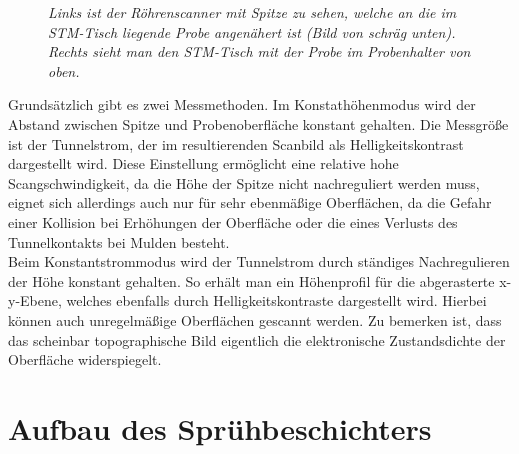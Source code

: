 \begin{figure}[H]
\centering
\sffamily

\caption{\textit{Links ist der Röhrenscanner mit Spitze zu sehen, welche an die im STM-Tisch
liegende Probe angenähert ist (Bild von schräg unten). Rechts sieht man den STM-Tisch mit der
Probe im Probenhalter von oben.}}
\label{stmaufbau}
\end{figure}

Grundsätzlich gibt es zwei Messmethoden. Im Konstathöhenmodus wird der Abstand zwischen Spitze und
Probenoberfläche konstant gehalten. Die Messgröße ist der Tunnelstrom, der im resultierenden
Scanbild als Helligkeitskontrast dargestellt wird. Diese Einstellung ermöglicht eine relative hohe
Scangschwindigkeit, da die Höhe der Spitze nicht nachreguliert werden muss, eignet sich
allerdings auch nur für sehr ebenmäßige Oberflächen, da die Gefahr einer Kollision bei Erhöhungen
der Oberfläche oder die eines Verlusts des Tunnelkontakts bei Mulden besteht.\\
Beim Konstantstrommodus wird der Tunnelstrom durch ständiges Nachregulieren der Höhe konstant
gehalten. So erhält man ein Höhenprofil für die abgerasterte x-y-Ebene, welches ebenfalls durch
Helligkeitskontraste dargestellt wird. Hierbei können auch unregelmäßige Oberflächen gescannt
werden. Zu bemerken ist, dass das scheinbar topographische Bild eigentlich die elektronische
Zustandsdichte der Oberfläche widerspiegelt.


\section{Aufbau des Sprühbeschichters}
\FloatBarrier

